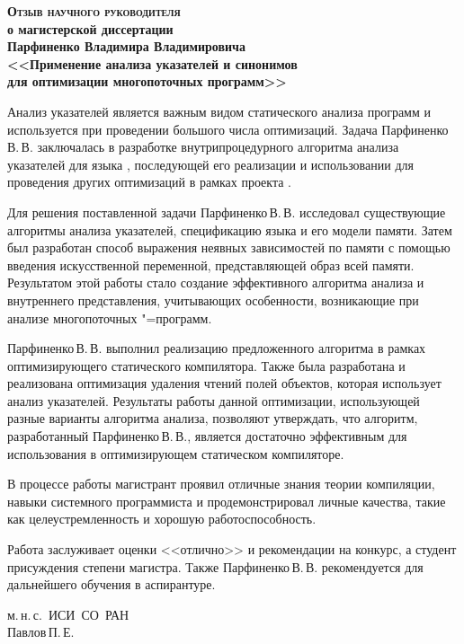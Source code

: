\documentclass[12pt]{article}
\newcommand\he{Парфиненко\,В.\,В.}
\begin{document}
  \thispagestyle{empty}

  \begin{center}
    \bfseries
    {\Large \scshape Отзыв научного руководителя}\\
    о магистерской диссертации\\
    Парфиненко Владимира Владимировича\\
    {\large
      <<Применение анализа указателей и синонимов\\
      для оптимизации многопоточных программ>>\\
    }
  \end{center}

  Анализ указателей является важным видом статического анализа программ и
  используется при проведении большого числа оптимизаций.
  Задача \he{} заключалась в разработке внутрипроцедурного алгоритма анализа
  указателей для языка , последующей его реализации и использовании
  для проведения других оптимизаций в рамках проекта .

  Для решения поставленной задачи \he{} исследовал существующие алгоритмы
  анализа указателей, спецификацию языка  и его модели памяти.
  Затем был разработан способ выражения неявных зависимостей по памяти с
  помощью введения искусственной переменной, представляющей образ всей памяти.
  Результатом этой работы стало создание эффективного алгоритма анализа и
  внутреннего представления, учитывающих особенности, возникающие при анализе
  многопоточных "=программ.

  \he{} выполнил реализацию предложенного алгоритма в рамках оптимизирующего
  статического компилятора.
  Также была разработана и реализована оптимизация удаления чтений полей
  объектов, которая использует анализ указателей.
  Результаты работы данной оптимизации, использующей разные варианты алгоритма
  анализа, позволяют утверждать, что алгоритм, разработанный \he{}, является
  достаточно эффективным для использования в оптимизирующем статическом
  компиляторе.

  В процессе работы магистрант проявил отличные знания теории компиляции,
  навыки системного программиста и продемонстрировал личные качества, такие как
  целеустремленность и хорошую работоспособность.

  Работа заслуживает оценки <<отлично>> и рекомендации на конкурс, а студент
  присуждения степени магистра.
  Также \he{} рекомендуется для дальнейшего обучения в аспирантуре.

  \begin{flushright}
    м.\,н.\,с.~ИСИ~СО~РАН\\
    Павлов\,П.\,Е.
  \end{flushright}
\end{document}
